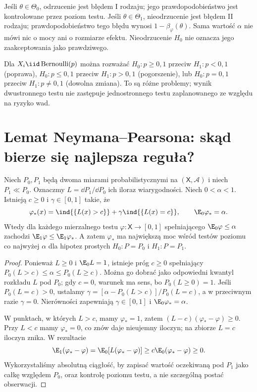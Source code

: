 Jeśli $\theta\in\Theta_0$, odrzucenie jest błędem I rodzaju; jego
prawdopodobieństwo jest kontrolowane przez poziom testu. Jeśli
$\theta\in\Theta_1$, nieodrzucenie jest błędem II rodzaju;
prawdopodobieństwo tego błędu wynosi $1-\beta_\varphi(\theta)$.
Sama wartość $\alpha$ nie mówi nic o mocy ani o rozmiarze efektu.
Nieodrzucenie $H_0$ nie oznacza jego zaakceptowania jako prawdziwego.

\begin{przyklad}
Dla $X_i\iid\operatorname{Bernoulli}(p)$ można rozważać
$H_0:p\ge 0{,}1$ przeciw $H_1:p<0{,}1$ (poprawa),
$H_0:p\le 0{,}1$ przeciw $H_1:p>0{,}1$ (pogorszenie),
lub $H_0:p=0{,}1$ przeciw $H_1:p\ne0{,}1$ (dowolna zmiana).
To są różne problemy; wynik dwustronnego testu nie zastępuje
jednostronnego testu zaplanowanego ze względu na ryzyko wad.
\end{przyklad}

\section{Lemat Neymana--Pearsona: skąd bierze się najlepsza reguła?}
\begin{twierdzenie}
\label{thm:neyman-pearson}
Niech $P_0,P_1$ będą dwoma miarami probabilistycznymi na
$(\mathsf X,\mathcal A)$ i niech $P_1\ll P_0$. Oznaczmy
$L=\dd P_1/\dd P_0$ ich iloraz wiarygodności. Niech
$0<\alpha<1$. Istnieją $c\ge0$ i $\gamma\in[0,1]$ takie, że
\[
 \varphi_*(x)=\ind{\{L(x)>c\}}+
 \gamma\ind{\{L(x)=c\}},\qquad \E_0\varphi_*=\alpha.
\]
Wtedy dla każdego mierzalnego testu $\varphi:\mathsf X\to[0,1]$
spełniającego $\E_0\varphi\le\alpha$ zachodzi
$\E_1\varphi\le\E_1\varphi_*$. A zatem $\varphi_*$ ma
największą moc wśród testów poziomu co najwyżej $\alpha$ dla
hipotez prostych $H_0:P=P_0$ i $H_1:P=P_1$.
\end{twierdzenie}
\begin{proof}
Ponieważ $L\ge0$ i $\E_0L=1$, istnieje próg $c\ge0$ spełniający
$P_0(L>c)\le\alpha\le P_0(L\ge c)$. Można go dobrać
jako odpowiedni kwantyl rozkładu $L$ pod $P_0$; gdy $c=0$,
warunek ma sens, bo $P_0(L\ge0)=1$. Jeśli
$P_0(L=c)>0$, ustalamy
$\gamma=[\alpha-P_0(L>c)]/P_0(L=c)$, a w przeciwnym razie
$\gamma=0$. Nierówności zapewniają $\gamma\in[0,1]$ i
$\E_0\varphi_*=\alpha$.

W punktach, w których $L>c$, mamy $\varphi_*=1$, zatem
$(L-c)(\varphi_*-\varphi)\ge0$. Przy $L<c$ mamy
$\varphi_*=0$, co znów daje nieujemny iloczyn; na zbiorze
$L=c$ iloczyn znika. W rezultacie
\[
 \E_1(\varphi_*-\varphi)
 =\E_0[L(\varphi_*-\varphi)]
 \ge c\E_0(\varphi_*-\varphi)\ge0.
\]
Wykorzystaliśmy absolutną ciągłość, by zapisać wartość
oczekiwaną pod $P_1$ jako całkę względem $P_0$, oraz kontrolę
poziomu testu, a nie szczególną postać obserwacji.
\end{proof}

